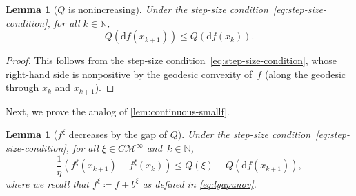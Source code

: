\documentclass[11pt,letterpaper]{article}
\newtheorem{lemma}[theorem]{Lemma}\AddToHook{env/lemma/begin}{\crefalias{theorem}{lemma}}
\numberwithin{equation}{section}
\newcommand{\NN}{\mathbb{N}}
\newcommand{\diff}{\mathrm{d}}
\newcommand{\MM}{\mathcal{M}}
\begin{document}
\begin{lemma}[$Q$ is nonincreasing]\label{lem:rel-largeF}
    Under the step-size condition~\eqref{eq:step-size-condition}, for all $k\in\NN$,
    \[
        Q(\diff f(x_{k+1})) \leq Q(\diff f(x_k)).
    \]
\end{lemma}
\begin{proof}
This follows from the step-size condition~\eqref{eq:step-size-condition}, whose right-hand side is nonpositive by the geodesic convexity of~$f$ (along the geodesic through $x_k$ and $x_{k+1}$).
\end{proof}

Next, we prove the analog of \cref{lem:continuous-smallf}.

\begin{lemma}[$f^\xi$ decreases by the gap of $Q$]\label{lem:rel-smallf}
    Under the step-size condition~\eqref{eq:step-size-condition}, for all $\xi \in C\MM^\infty$ and~$k\in\NN$,
    \[
        \frac1\eta \left( f^\xi(x_{k+1}) - f^\xi(x_k) \right) \leq Q(\xi) - Q(\diff f(x_{k+1})),
    \]
    where we recall that $f^\xi \coloneqq f + b^\xi$ as defined in \cref{eq:lyapunov}.
\end{lemma}
\end{document}

